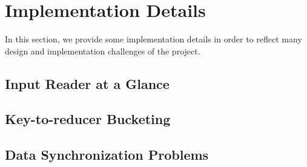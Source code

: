 \section{Implementation Details}

In this section, we provide some implementation details in order to reflect many design and implementation challenges of the project.

\subsection{Input Reader at a Glance}

\subsection{Key-to-reducer Bucketing}

\subsection{Data Synchronization Problems}